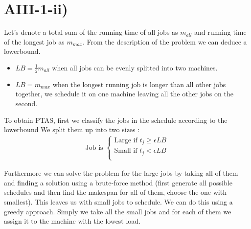 \section*{AIII-1-ii)}
\label{approx-3-1-ii}

Let's denote a total sum of the running time of all jobs as $ m_{all} $ and running time of the longest job as $ m_{max} $.
From the description of the problem we can deduce a lowerbound.
\begin{itemize}
	\item $ LB = \frac{1}{2} m_{all} $ when all jobs can be evenly splitted into two machines.
	\item $ LB = m_{max} $ when the longest running job is longer than all other jobs together, we schedule it on one
		machine leaving all the other jobs on the second.
\end{itemize}

To obtain PTAS, first we classify the jobs in the schedule according to the lowerbound
We split them up into two sizes :
\begin{align*}
    \text{Job is } \begin{cases}
        \text{Large} \text{ if } t_j \ge \epsilon LB \\
        \text{Small} \text{ if } t_j < \epsilon LB \\
    \end{cases}
\end{align*}

Furthermore we can solve the problem for the large jobs by taking all of them and finding a solution using a brute-force method
(first generate all possible schedules and then find the makespan for all of them, choose the one with smallest).
This leaves us with small jobs to schedule. We can do this using a greedy approach. Simply we take all the small jobs and for each
of them we assign it to the machine with the lowest load.


